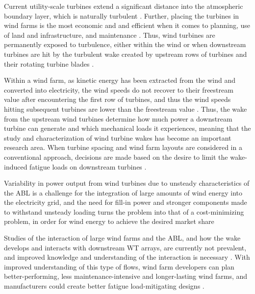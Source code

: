 Current utility-scale turbines extend a significant distance into the atmospheric boundary layer, which is naturally turbulent \cite{Neunaber} \cite{Tossas2014}. Further, placing the turbines in wind farms is the most economic and and efficient when it comes to planning, use of land and infrastructure, and maintenance \cite{Neunaber}. Thus, wind turbines are permanently exposed to turbulence, either within the wind or when downstream turbines are hit by the turbulent wake created by upstream rows of turbines and their rotating turbine blades \cite{Neunaber} \cite{Tossas2014}. 

Within a wind farm, as kinetic energy has been extracted from the wind and converted into electricity, the wind speeds do not recover to their freestream value after encountering the first row of turbines, and thus the wind speeds hitting subsequent turbines are lower than the freestream value \cite{Barthelmie2010}. Thus, the wake from the upstream wind turbines determine how much power a downstream turbine can generate and which mechanical loads it experiences, meaning that the study and characterization of wind turbine wakes has become an important research area. \cite{Neunaber} \cite{Tossas2014} When turbine spacing and wind farm layouts are considered in a conventional approach, decisions are made based on the desire to limit the wake-induced fatigue loads on downstream turbines \cite{Meyers2012}. 

Variability in power output from wind turbines due to unsteady characteristics of the ABL is a challenge for the integration of large amounts of wind energy into the electricity grid, and the need for fill-in power and stronger components made to withstand unsteady loading turns the problem into that of a cost-minimizing problem, in order for wind energy to achieve the desired market share \cite{Bossuyt2016}


Studies of the interaction of large wind farms and the ABL, and how the wake develops and interacts with downstream WT arrays, are currently not prevalent, and improved knowledge and understanding of the interaction is necessary \cite{Meyers2012} \cite{Bossuyt2016} \cite{Sforza1981} \cite{Tossas2014} \cite{Aubrun2019}. With improved understanding of this type of flows, wind farm developers can plan better-performing, less maintenance-intensive and longer-lasting wind farms, and manufacturers could create better fatigue load-mitigating designs \cite{Tossas2014}. 


